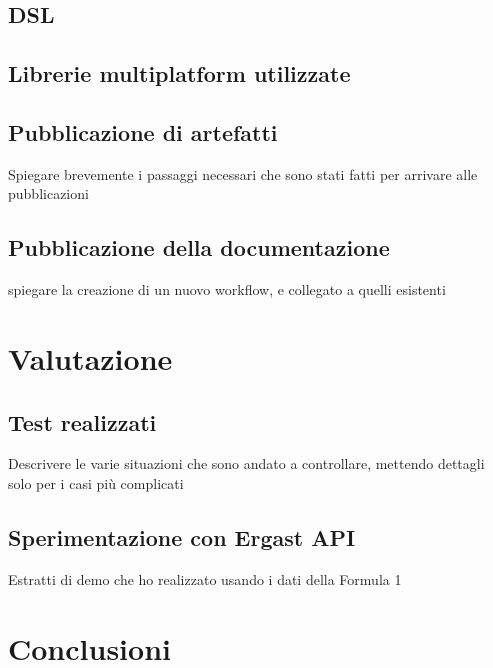 \documentclass[12pt,a4paper,openright,twoside]{book}
\begin{document}
\section{DSL }

\section{Librerie multiplatform utilizzate}

\section{Pubblicazione di artefatti}
Spiegare brevemente i passaggi necessari che sono stati fatti per arrivare
alle pubblicazioni

\section{Pubblicazione della documentazione}
spiegare la creazione di un nuovo workflow, e collegato a quelli esistenti
\chapter{Valutazione}

\section{Test realizzati}
Descrivere le varie situazioni che sono andato a controllare,
mettendo dettagli solo per i casi più complicati

\section{Sperimentazione con Ergast API}
Estratti di demo che ho realizzato usando i dati della Formula 1
\chapter{Conclusioni}





%
%
%
\end{document}
